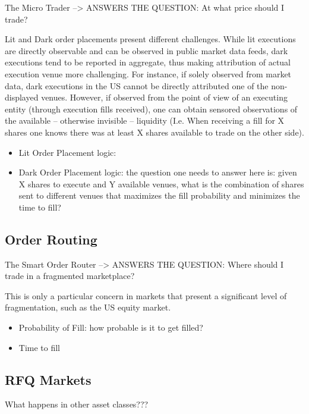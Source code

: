 The Micro Trader --> ANSWERS THE QUESTION: At what price should I trade?

Lit and Dark order placements present different challenges. While lit executions are directly observable and can be observed in public market data feeds, dark executions tend to be reported in aggregate, thus making attribution of actual execution venue more challenging. For instance, if solely observed from market data, dark executions in the US cannot be directly attributed one of the non-displayed venues. However, if observed from the point of view of an executing entity (through execution fills received), one can obtain sensored observations of the available -- otherwise invisible -- liquidity (I.e. When receiving a fill for X shares one knows there was at least X shares available to trade on the other side).

\begin{itemize}
\item Lit Order Placement logic:

\item Dark Order Placement logic: the question one needs to answer here is: given X shares to execute and Y available venues, what is the combination of shares sent to different venues that maximizes the fill probability and minimizes the time to fill?

\end{itemize}


\subsection{Order Routing}

The Smart Order Router --> ANSWERS THE QUESTION: Where should I trade in a fragmented marketplace?

This is only a particular concern in markets that present a significant level of fragmentation, such as the US equity market. 

\begin{itemize}
\item Probability of Fill: how probable is it to get filled? 

\item Time to fill
\end{itemize}


\subsection{RFQ Markets}
What happens in other asset classes???